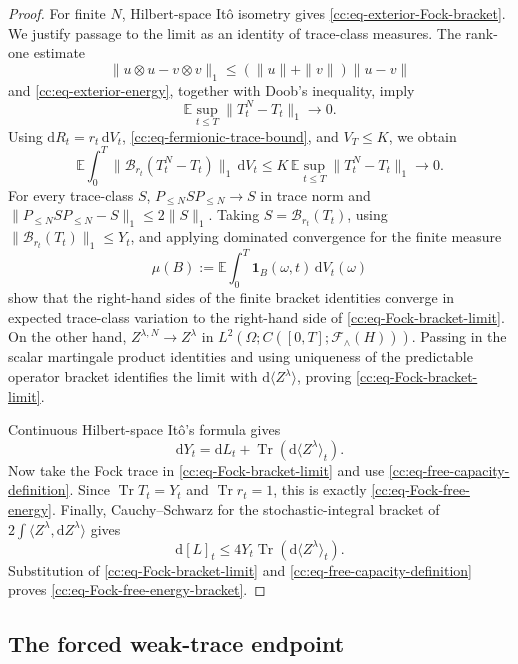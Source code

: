 \documentclass[10pt,reqno]{amsart}
\theoremstyle{plain}
\theoremstyle{definition}
\theoremstyle{remark}
\begin{document}
\begin{proof}
For finite \(N\), Hilbert-space It\^o isometry gives
\eqref{cc:eq-exterior-Fock-bracket}.  We justify passage to the limit as an
identity of trace-class measures.  The rank-one estimate
\[
 \|u\otimes u-v\otimes v\|_1
 \leq(\|u\|+\|v\|)\|u-v\|
\]
and \eqref{cc:eq-exterior-energy}, together with Doob's inequality, imply
\begin{equation}
 \mathbb E\sup_{t\leq T}\|T_t^N-T_t\|_1\longrightarrow0.
 \label{cc:eq-Fock-rank-one-convergence}
\end{equation}
Using \(\mathrm dR_t=r_t\,\mathrm dV_t\),
\eqref{cc:eq-fermionic-trace-bound}, and \(V_T\leq K\), we obtain
\[
 \mathbb E\int_0^T
 \|\mathcal B_{r_t}(T_t^N-T_t)\|_1\,\mathrm dV_t
 \leq K\,\mathbb E\sup_{t\leq T}\|T_t^N-T_t\|_1
 \longrightarrow0.
\]
For every trace-class \(S\),
\(
 P_{\leq N}SP_{\leq N}\to S
\)
in trace norm and
\(
 \|P_{\leq N}SP_{\leq N}-S\|_1\leq2\|S\|_1
\).
Taking \(S=\mathcal B_{r_t}(T_t)\), using
\(
 \|\mathcal B_{r_t}(T_t)\|_1\leq Y_t
\), and applying dominated convergence for the finite measure
\[
 \mu(B):=\mathbb E\int_0^T
          \mathbf1_B(\omega,t)\,\mathrm dV_t(\omega)
\]
show that the right-hand sides of the
finite bracket identities converge in expected trace-class variation to
the right-hand side of \eqref{cc:eq-Fock-bracket-limit}.  On the other
hand, \(Z^{\lambda,N}\to Z^\lambda\) in
\(L^2(\Omega;C([0,T];\mathcal F_{\wedge}(H)))\).  Passing in the scalar
martingale product identities and using uniqueness of the predictable
operator bracket identifies the limit with
\(\mathrm d\langle Z^\lambda\rangle\), proving
\eqref{cc:eq-Fock-bracket-limit}.

Continuous Hilbert-space It\^o's formula gives
\[
 \mathrm dY_t=\mathrm dL_t+
 \operatorname{Tr}(\mathrm d\langle Z^\lambda\rangle_t).
\]
Now take the Fock trace in \eqref{cc:eq-Fock-bracket-limit} and use
\eqref{cc:eq-free-capacity-definition}.  Since
\(\operatorname{Tr}T_t=Y_t\) and \(\operatorname{Tr}r_t=1\), this is
exactly \eqref{cc:eq-Fock-free-energy}.  Finally, Cauchy--Schwarz for the
stochastic-integral bracket of
\(2\int\langle Z^\lambda,\mathrm dZ^\lambda\rangle\) gives
\[
 \mathrm d[L]_t
 \leq4Y_t\operatorname{Tr}
       (\mathrm d\langle Z^\lambda\rangle_t).
\]
Substitution of \eqref{cc:eq-Fock-bracket-limit} and
\eqref{cc:eq-free-capacity-definition} proves
\eqref{cc:eq-Fock-free-energy-bracket}.
\end{proof}

\subsection{The forced weak-trace endpoint}
\label{cc:subsec-critical-split-endpoint}
\end{document}
